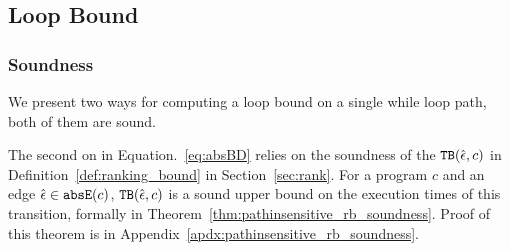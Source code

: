 \subsection{Loop Bound}

\subsubsection{Soundness}
We present two ways for computing a loop bound on a single while loop path, both of them are sound.

The second on in Equation.~\ref{eq:absBD} relies on the soundness of the ${\mathtt{TB}}(\hat{\mathtt{\epsilon}{}}, c)$
in Definition~\ref{def:ranking_bound} in Section~\ref{sec:rank}.
For a program $c$ and an edge $\hat{\mathtt{\epsilon}{}} \in \mathtt{abs}{\mathtt{E}}(c)$, ${\mathtt{TB}}(\hat{\mathtt{\epsilon}{}}, c)$ is a sound upper bound on the execution times of this transition,
formally in Theorem~\ref{thm:pathinsensitive_rb_soundness}. 
Proof of this theorem is in Appendix~\ref{apdx:pathinsensitive_rb_soundness}.

